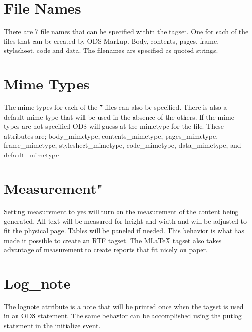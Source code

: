 \section{File Names}
There are 7 file names that can be specified within the tagset.  One for each of
the files that can be created by ODS Markup.  Body, contents, pages, frame, stylesheet,
code and data.  The filenames are specified as quoted strings.


\section{Mime Types}
The mime types for each of the 7 files can also be specified.  There is also
a default mime type that will be used in the absence of the others.  If the 
mime types are not specified ODS will guess at the mimetype for the file.
These attributes are; body\_mimetype, contents\_mimetype, pages\_mimetype, frame\_mimetype,
stylesheet\_mimetype, code\_mimetype, data\_mimetype, and default\_mimetype.


\section{Measurement"}
Setting measurement to yes will turn on the measurement of the content being
generated.  All text will be measured for height and width and will be adjusted
to fit the physical page.  Tables will be paneled if needed.  This behavior is
what has made it possible to create an RTF tagset.  The MLaTeX tagset also takes
advantage of measurement to create reports that fit nicely on paper.



\section{Log\_note}
The lognote attribute is a note that will be printed once when the tagset 
is used in an ODS statement.  The same behavior can be accomplished using
the putlog statement in the initialize event.

